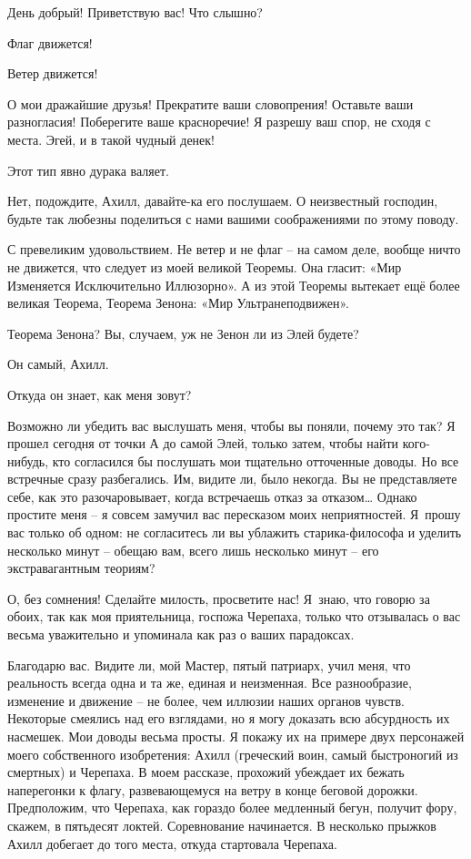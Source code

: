 \documentclass[../main.tex]{subfiles}
\begin{document}
\begin{dialogue}

 День добрый! Приветствую вас! Что слышно?

 Флаг движется!

 Ветер движется!

 О мои дражайшие друзья! Прекратите ваши словопрения! Оставьте ваши разногласия! Поберегите ваше красноречие! Я разрешу ваш спор, не сходя с места. Эгей, и в такой чудный денек!

 Этот тип явно дурака валяет.

 Нет, подождите, Ахилл, давайте-ка его послушаем. О неизвестный господин, будьте так любезны поделиться с нами вашими соображениями по этому поводу.

 С превеликим удовольствием. Не ветер и не флаг \--- на самом деле, вообще ничто не движется, что следует из моей великой Теоремы. Она гласит: «Мир Изменяется Исключительно Иллюзорно». А из этой Теоремы вытекает ещё более великая Теорема, Теорема Зенона: «Мир Ультранеподвижен».

 Теорема Зенона? Вы, случаем, уж не Зенон ли из Элей будете?

 Он самый, Ахилл.

 Откуда он знает, как меня зовут?

 Возможно ли убедить вас выслушать меня, чтобы вы поняли, почему это так? Я прошел сегодня от точки А до самой Элей, только затем, чтобы найти кого-нибудь, кто согласился бы послушать мои тщательно отточенные доводы. Но все встречные сразу разбегались. Им, видите ли, было некогда. Вы не представляете себе, как это разочаровывает, когда встречаешь отказ за отказом\ldots{} Однако простите меня \--- я совсем замучил вас пересказом моих неприятностей. Я~прошу вас только об одном: не согласитесь ли вы ублажить старика-философа и уделить несколько минут \--- обещаю вам, всего лишь несколько минут \--- его экстравагантным теориям?

 О, без сомнения! Сделайте милость, просветите нас! Я~знаю, что говорю за обоих, так как моя приятельница, госпожа Черепаха, только что отзывалась о вас весьма уважительно и упоминала как раз о ваших парадоксах.

 Благодарю вас. Видите ли, мой Мастер, пятый патриарх, учил меня, что реальность всегда одна и та же, единая и неизменная. Все разнообразие, изменение и движение \--- не более, чем иллюзии наших органов чувств. Некоторые смеялись над его взглядами, но я могу доказать всю абсурдность их насмешек. Мои доводы весьма просты. Я покажу их на примере двух персонажей моего собственного изобретения: Ахилл (греческий воин, самый быстроногий из смертных) и Черепаха. В моем рассказе, прохожий убеждает их бежать наперегонки к флагу, развевающемуся на ветру в конце беговой дорожки. Предположим, что Черепаха, как гораздо более медленный бегун, получит фору, скажем, в пятьдесят локтей. Соревнование начинается. В несколько прыжков Ахилл добегает до того места, откуда стартовала Черепаха.


\end{dialogue}
\end{document}
